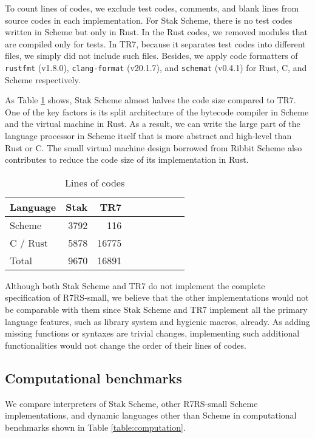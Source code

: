 \documentclass[sigplan, anonymous, review]{acmart}
\begin{document}
To count lines of codes, we exclude test codes, comments, and blank
lines from source codes in each implementation.
For Stak Scheme, there is no test codes written in Scheme but only in Rust.
In the Rust codes, we removed modules that are compiled only for tests.
In TR7, because it separates test codes into different files, we simply did not
include such files.
Besides, we apply code formatters of \texttt{rustfmt} (v1.8.0),
\texttt{clang-format} (v20.1.7), and \texttt{schemat} (v0.4.1) for
Rust, C, and Scheme respectively.

As Table \ref{table:loc} shows, Stak Scheme almost
halves the code size compared to TR7.
One of the key factors is its split architecture of the bytecode
compiler in Scheme and the virtual machine in Rust.
As a result, we can write the large part of the language processor in Scheme
itself that is more abstract and high-level than Rust or C.
The small virtual machine design borrowed from Ribbit Scheme also
contributes to reduce the code size of its implementation in Rust.

\begin{table}
  \begin{center}
    \caption{Lines of codes}
    \label{table:loc}
    \begin{tabular}{l|rrrrrrrr}
      \hline
      Language & Stak & TR7  \\
      \hline
      Scheme & 3792 & 116 \\
      C / Rust & 5878 & 16775 \\
      Total & 9670 & 16891 \\
      \hline
    \end{tabular}
  \end{center}
\end{table}

Although both Stak Scheme and TR7 do not implement the complete
specification of R7RS-small, we believe that the other
implementations would not be comparable with them since
Stak Scheme and TR7 implement all the primary language features,
such as library system and hygienic macros, already.
As adding missing functions or syntaxes are trivial changes,
implementing such additional functionalities would not change the
order of their lines of codes.

\subsection{Computational benchmarks}

We compare interpreters of Stak Scheme, other R7RS-small Scheme
implementations, and
dynamic languages other than Scheme in computational
benchmarks shown in Table \ref{table:computation}.
\end{document}
